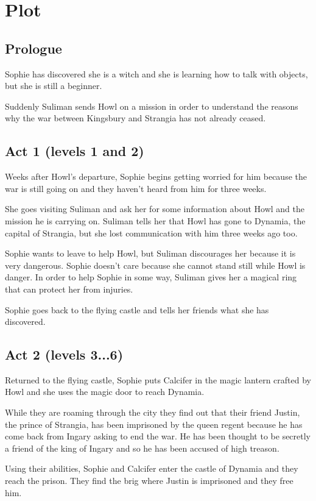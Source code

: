\section{Plot}

\subsection*{Prologue}
Sophie has discovered she is a witch and she is learning how to talk with objects, but she is still a beginner.

Suddenly Suliman sends Howl on a mission in order to understand the reasons why the war between Kingsbury and Strangia has not already ceased.

\subsection*{Act 1 (levels 1 and 2)}
Weeks after Howl's departure, Sophie begins getting worried for him because the war is still going on and they haven't heard from him for three weeks.

She goes visiting Suliman and ask her for some information about Howl and the mission he is carrying on. Suliman tells her that Howl has gone to Dynamia, the capital of Strangia, but she lost communication with him three weeks ago too.

Sophie wants to leave to help Howl, but Suliman discourages her because it is very dangerous. Sophie doesn't care because she cannot stand still while Howl is danger. In order to help Sophie in some way, Suliman gives her a magical ring that can protect her from injuries.

Sophie goes back to the flying castle and tells her friends what she has discovered.

\subsection*{Act 2 (levels 3...6)}
Returned to the flying castle, Sophie puts Calcifer in the magic lantern crafted by Howl and she uses the magic door to reach Dynamia.

While they are roaming through the city they find out that their friend Justin, the prince of Strangia, has been imprisoned by the queen regent because he has come back from Ingary asking to end the war. He has been thought to be secretly a friend of the king of Ingary and so he has been accused of high treason. 

Using their abilities, Sophie and Calcifer enter the castle of Dynamia and they reach the prison. They find the brig where Justin is imprisoned and they free him.

